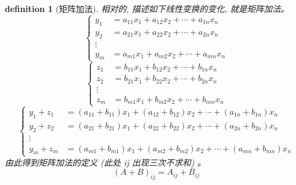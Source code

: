\documentclass{ctexart}
\newtheorem{definition}{definition}
\begin{document}
    \begin{definition}
        [矩阵加法] 相对的, 描述如下线性变换的变化, 就是矩阵加法。
        \begin{equation}
            \label {eq:矩阵加法}
            \left \{
            \begin{aligned}
                y_1 &= a_{11}x_1 + a_{12}x_2 + \cdots + a_{1n}x_n \\
                y_2 &= a_{21}x_1 + a_{22}x_2 + \cdots + a_{2n}x_n \\
                \vdots \\
                y_m &= a_{m1}x_1 + a_{m2}x_2 + \cdots + a_{mn}x_n
            \end{aligned}
            \right .
        \end{equation}
        \begin{equation}
            \label {eq:矩阵加法2}
            \left \{
            \begin{aligned}
                z_1 &= b_{11}x_1 + b_{12}x_2 + \cdots + b_{1n}x_n \\
                z_2 &= b_{21}x_1 + b_{22}x_2 + \cdots + b_{2n}x_n \\
                \vdots \\
                z_m &= b_{m1}x_1 + b_{m2}x_2 + \cdots + b_{mn}x_n
            \end{aligned}
            \right .
        \end{equation}
        \begin{equation}
            \label {eq:矩阵加法3}
            \left \{
            \begin{aligned}
                y_1 + z_1 &= (a_{11} + b_{11})x_1 + (a_{12} + b_{12})x_2 + \cdots + (a_{1n} + b_{1n})x_n \\
                y_2 + z_2 &= (a_{21} + b_{21})x_1 + (a_{22} + b_{22})x_2 + \cdots + (a_{2n} + b_{2n})x_n \\
                \vdots \\
                y_m + z_m &= (a_{m1} + b_{m1})x_1 + (a_{m2} + b_{m2})x_2 + \cdots + (a_{mn} + b_{mn})x_n
            \end{aligned}
            \right .
        \end{equation}
        由此得到矩阵加法的定义 (此处 ij 出现三次不求和) 。 
        \begin{equation}
            {(A + B)}_{ij} = A_{ij} + B_{ij}
        \end{equation}
    \end{definition}
\end{document}
